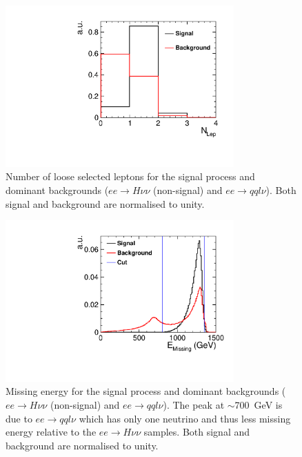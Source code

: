 \begin{figure}
  \centering
  \includegraphics[width=0.78\textwidth,keepaspectratio]{HiggsAnalysis/figures/nLep_PreSelection}
  \caption[Number of reconstructed loose selected lepton for signal and background events]{Number of loose selected leptons for the signal process and dominant backgrounds ($ee\rightarrow H\nu\nu$ (non-signal) and $ee\rightarrow qql\nu$). Both signal and background are normalised to unity.}
  \label{fig:nLepPreSel}
\end{figure}

\begin{figure}
  \centering
  \includegraphics[width=0.78\textwidth,keepaspectratio]{HiggsAnalysis/figures/EMissing_PreSelection}
  \caption[Missing energy of signal and background events]{Missing energy for the signal process and dominant backgrounds ($ee\rightarrow H\nu\nu$ (non-signal) and $ee\rightarrow qql\nu$). The peak at $\sim$700~GeV is due to $ee\rightarrow qql\nu$ which has only one neutrino and thus less missing energy relative to the $ee\rightarrow H\nu\nu$ samples. Both signal and background are normalised to unity.}
  \label{fig:EMissPreSel}
\end{figure}

